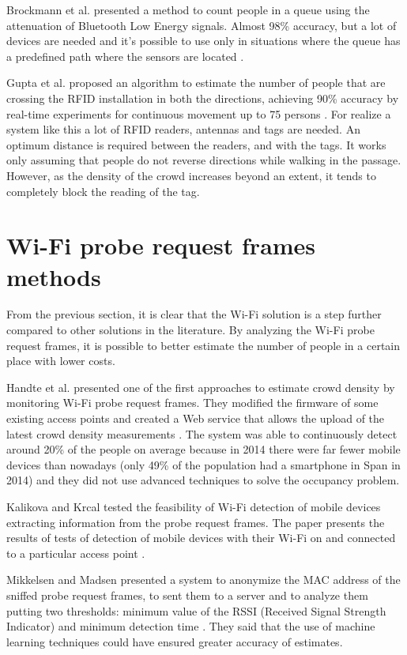 Brockmann et al. presented a method to count people in a queue using the attenuation of Bluetooth Low Energy signals. Almost 98\% accuracy, but a lot of devices are needed and it's possible to use only in situations where the queue has a predefined path where the sensors are located \cite{brockmann2018cutiqueue}.

Gupta et al. proposed an algorithm to estimate the number of people that are crossing the RFID installation in both the directions, achieving 90\% accuracy by real-time experiments for continuous movement up to 75 persons \cite{gupta2018device}. For realize a system like this a lot of RFID readers, antennas and tags are needed. An optimum distance is required between the readers, and with the tags. It works only assuming that people do not reverse directions while walking in the passage. However, as the density of the crowd increases beyond an extent, it tends to completely block the reading of the tag.


\section{Wi-Fi probe request frames methods}
\label{sec:probe}
\vspace{0.2 cm}

From the previous section, it is clear that the Wi-Fi solution is a step further compared to other solutions in the literature. By analyzing the Wi-Fi probe request frames, it is possible to better estimate the number of people in a certain place with lower costs.

Handte et al. presented one of the first approaches to estimate crowd density by monitoring Wi-Fi probe request frames. They modified the firmware of some existing access points and created a Web service that allows the upload of the latest crowd density measurements \cite{handte2014crowd}. The system was able to continuously detect around 20\% of the people on average because in 2014 there were far fewer mobile devices than nowadays (only 49\% of the population had a smartphone in Span in 2014) and they did not use advanced techniques to solve the occupancy problem.

Kalikova and Krcal tested the feasibility of Wi-Fi detection of mobile devices extracting information from the probe request frames. The paper presents the results of tests of detection of mobile devices with their Wi-Fi on and connected to a particular access point  \cite{kalikova2017people}.

Mikkelsen and Madsen presented a system to anonymize the MAC address of the sniffed probe request frames, to sent them to a server and to analyze them putting two thresholds: minimum value of the RSSI (Received Signal Strength Indicator) and minimum detection time \cite{mikkelsen2016public}. They said that the use of machine learning techniques could have ensured greater accuracy of estimates.

